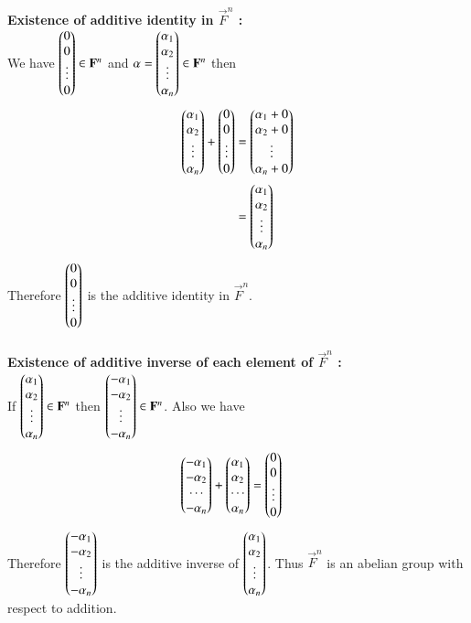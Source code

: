 \documentclass[journal,12pt,twocolumn]{IEEEtran}
\begin{document}
{\bf Existence of additive identity in $\vec{F}^n$ :} \\ 
We have $\begin{pmatrix}0\\ 0\\ \vdots\\ 0\end{pmatrix} \in \mathbf{F}^n$
and $\alpha=\begin{pmatrix}\alpha_1\\ \alpha_2\\ \vdots\\ \alpha_n\end{pmatrix} \in \mathbf{F}^n$ then
\begin{align}
	\begin{pmatrix}\alpha_1\\ \alpha_2\\ \vdots\\ \alpha_n\end{pmatrix}
	+\begin{pmatrix}0\\ 0\\ \vdots\\ 0\end{pmatrix}
	&=\begin{pmatrix}\alpha_1+0\\ \alpha_2+0\\ \vdots\\ \alpha_n+0\end{pmatrix} \\
	&=\begin{pmatrix}\alpha_1\\ \alpha_2\\ \vdots\\ \alpha_n\end{pmatrix} 
\end{align}
Therefore $\begin{pmatrix}0\\ 0\\ \vdots\\ 0\end{pmatrix}$ is the additive identity in 
$\vec{F}^n$.\\ \\
{\bf Existence of additive inverse of each element of $\vec{F}^n$ :} \\
If $\begin{pmatrix}\alpha_1\\ \alpha_2\\ \vdots\\ \alpha_n\end{pmatrix} \in \mathbf{F}^n$ then 
$\begin{pmatrix}-\alpha_1\\ -\alpha_2\\ \vdots\\ -\alpha_n\end{pmatrix} \in \mathbf{F}^n$. 
Also we have
\begin{align}
	\begin{pmatrix}-\alpha_1\\ -\alpha_2\\ \cdots\\ -\alpha_n\end{pmatrix}
	+\begin{pmatrix}\alpha_1\\ \alpha_2\\ \cdots\\ \alpha_n\end{pmatrix}
	&=\begin{pmatrix}0\\ 0\\ \vdots\\ 0\end{pmatrix}
\end{align}
Therefore $\begin{pmatrix}-\alpha_1\\ -\alpha_2\\ \vdots\\ -\alpha_n\end{pmatrix}$ is the 
additive inverse of $\begin{pmatrix}\alpha_1\\ \alpha_2\\ \vdots\\ \alpha_n\end{pmatrix}$.
Thus $\vec{F}^n$ is an abelian group with respect to addition. \\
\end{document}
